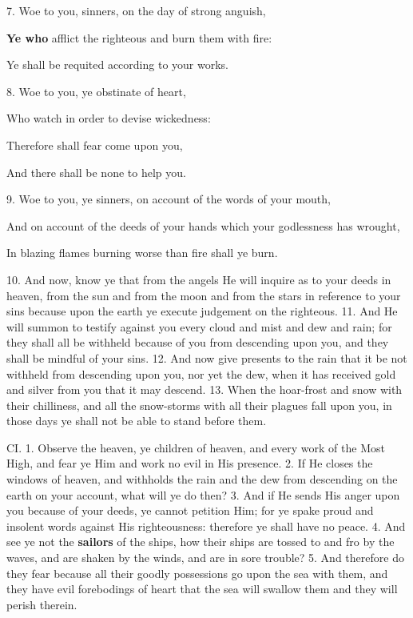 7. Woe to you, sinners, on the day of strong anguish,

\textbf{Ye who} afflict the righteous and burn them with fire:

Ye shall be requited according to your works.

8. Woe to you, ye obstinate of heart,

Who watch in order to devise wickedness:

Therefore shall fear come upon you,

And there shall be none to help you.

9. Woe to you, ye sinners, on account of the words of your mouth,

And on account of the deeds of your hands which your godlessness has wrought,

In blazing flames burning worse than fire shall ye burn.

10. And now, know ye that from the angels He
will inquire as to your deeds in heaven, from the sun
and from the moon and from the stars in reference
to your sins because upon the earth ye execute judgement
on the righteous. 11. And He will summon to
testify against you every cloud and mist and dew
and rain; for they shall all be withheld because of
you from descending upon you, and they shall be
mindful of your sins. 12. And now give presents
to the rain that it be not withheld from descending
upon you, nor yet the dew, when it has received gold
and silver from you that it may descend. 13. When
the hoar-frost and snow with their chilliness, and all
the snow-storms with all their plagues fall upon you,
in those days ye shall not be able to stand before
them.


CI. 1. Observe the heaven, ye children of heaven,
and every work of the Most High, and fear ye Him
and work no evil in His presence. 2. If He closes
the windows of heaven, and withholds the rain and
the dew from descending on the earth on your account,
what will ye do then? 3. And if He sends His
anger upon you because of your deeds, ye cannot
petition Him; for ye spake proud and insolent words
against His righteousness: therefore ye shall have
no peace. 4. And see ye not the \textbf{sailors} of the ships,
how their ships are tossed to and fro by the waves, and
are shaken by the winds, and are in sore trouble?
5. And therefore do they fear because all their goodly
possessions go upon the sea with them, and they have
evil forebodings of heart that the sea will swallow
them and they will perish therein.

